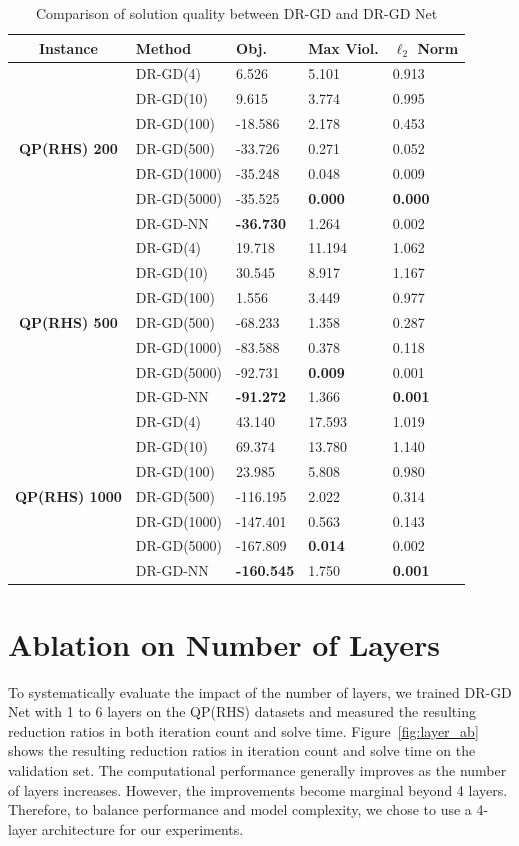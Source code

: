 \documentclass[10pt]{article} %
\begin{document}
\begin{table}[h!]
    \centering
        \caption{Comparison of solution quality between DR-GD and DR-GD Net}
    \label{tab:compare_dr_gd}
    \begin{tabular}{@{}c l l l l}
    \toprule
    \bf Instance & \bf Method & \bf Obj. & \bf Max Viol. & \bf $\ell_2$ Norm \\
    \toprule
     \multirow{7}{*}{\textbf{QP(RHS) 200}} &
DR-GD(4)&6.526 &5.101  &0.913 \\
&DR-GD(10)&9.615 &3.774  &0.995 \\
&DR-GD(100)&-18.586 &2.178  &0.453 \\
&DR-GD(500)&-33.726 &0.271  &0.052 \\
&DR-GD(1000)&-35.248 &0.048  &0.009 \\
&DR-GD(5000)&-35.525 &\bf 0.000  &\bf 0.000 \\
&DR-GD-NN&\bf -36.730 &1.264  &0.002 \\
\midrule
 \multirow{7}{*}{\textbf{QP(RHS) 500}} &
DR-GD(4)&19.718 &11.194  &1.062 \\
&DR-GD(10)&30.545 &8.917  &1.167 \\
&DR-GD(100)&1.556 &3.449  &0.977 \\
&DR-GD(500)&-68.233 &1.358  &0.287 \\
&DR-GD(1000)&-83.588 &0.378  &0.118 \\
&DR-GD(5000)&-92.731 &\bf 0.009  &0.001 \\
&DR-GD-NN&\bf -91.272 &1.366  &\bf 0.001 \\
\midrule
\multirow{7}{*}{\textbf{QP(RHS) 1000}} &
DR-GD(4)&43.140 &17.593  &1.019 \\
&DR-GD(10)&69.374 &13.780  &1.140 \\
&DR-GD(100)&23.985 &5.808  &0.980 \\
&DR-GD(500)&-116.195 &2.022  &0.314 \\
&DR-GD(1000)&-147.401 &0.563  &0.143 \\
&DR-GD(5000)&-167.809 &\bf 0.014  &0.002 \\
&DR-GD-NN&\bf -160.545 &1.750 &\bf 0.001 \\
\bottomrule
\end{tabular}
\end{table}


\clearpage
\newpage
\section{Ablation on Number of Layers}
To systematically evaluate the impact of the number of layers, we trained DR-GD Net with 1 to 6 layers on the QP(RHS) datasets and measured the resulting reduction ratios in both iteration count and solve time. Figure~\ref{fig:layer_ab} shows the resulting reduction ratios in iteration count and solve time on the validation set.
The computational performance generally improves as the number of layers increases. However, the improvements become marginal beyond 4 layers. 
Therefore, to balance performance and model complexity, we chose to use a 4-layer architecture for our experiments. 
\end{document}
